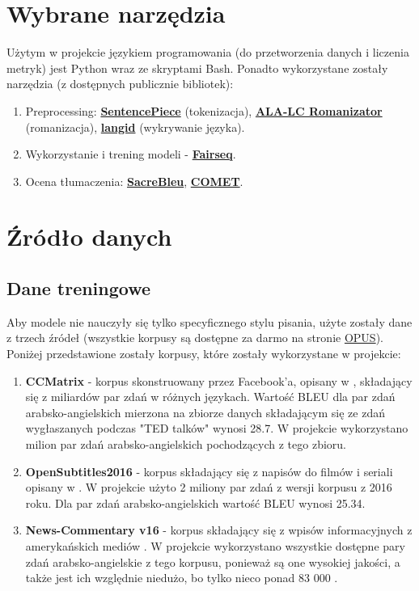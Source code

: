 \documentclass[
    left=2.5cm,         %
    right=2.5cm,        %
    top=2.5cm,          %
    bottom=3cm,         %
    bindingoffset=6mm,  %
    nohyphenation=false %
]{eiti/eiti-report}
\begin{document}
\section{Wybrane narzędzia}
Użytym w projekcie językiem programowania (do przetworzenia danych i liczenia metryk) jest Python wraz ze skryptami Bash. Ponadto wykorzystane zostały narzędzia (z dostępnych publicznie bibliotek):
\begin{enumerate}
    \item Preprocessing: \textbf{\href{https://github.com/google/sentencepiece}{SentencePiece}} (tokenizacja), \textbf{\href{https://github.com/CAMeL-Lab/Arabic_ALA-LC_Romanization}{ALA-LC Romanizator}} (romanizacja), \textbf{\href{https://github.com/saffsd/langid.py}{langid}} (wykrywanie języka).
    \item Wykorzystanie i trening modeli - \textbf{\href{https://fairseq.readthedocs.io/en/latest/}{Fairseq}}.
    \item Ocena tłumaczenia: \textbf{\href{https://github.com/mjpost/sacrebleu}{SacreBleu}}, \textbf{\href{https://unbabel.github.io/COMET/html/index.html}{COMET}}.
\end{enumerate}

\section{Źródło danych}
\subsection{Dane treningowe}
Aby modele nie nauczyły się tylko specyficznego stylu pisania, użyte zostały dane z trzech źródeł (wszystkie korpusy są dostępne za darmo na stronie \href{https://opus.nlpl.eu/}{OPUS}). Poniżej przedstawione zostały korpusy, które zostały wykorzystane w projekcie:
\begin{enumerate}
    \item \textbf{CCMatrix} - korpus skonstruowany przez Facebook'a, opisany w \cite{CCmatrix}, składający się z miliardów par zdań w różnych językach. Wartość BLEU dla par zdań arabsko-angielskich mierzona na zbiorze danych składającym się ze zdań wygłaszanych podczas "TED talków"  \cite{Ye2018WordEmbeddings} wynosi 28.7. W projekcie wykorzystano milion par zdań arabsko-angielskich pochodzących z tego zbioru.
    \item \textbf{OpenSubtitles2016} - korpus składający się z napisów do filmów i seriali opisany w \cite{OpenSubtitles}. W projekcie użyto 2 miliony par zdań z wersji korpusu z 2016 roku. Dla par zdań arabsko-angielskich wartość BLEU wynosi 25.34. 
    \item \textbf{News-Commentary v16} - korpus składający się z wpisów informacyjnych z amerykańskich mediów \cite{TIEDEMANN12.463}. W projekcie wykorzystano wszystkie dostępne pary zdań arabsko-angielskie z tego korpusu, ponieważ są one wysokiej jakości, a także jest ich względnie niedużo, bo tylko nieco ponad 83 000 .
\end{enumerate}
\end{document}
